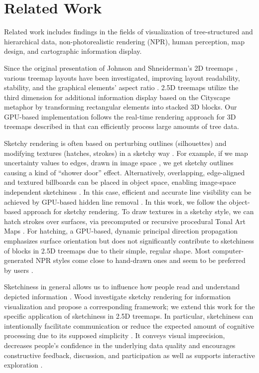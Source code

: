 
\section{Related Work}
\label{sec:related}

\noindent
Related work includes findings in the fields of visualization of tree-structured and hierarchical data, non-photorealistic rendering (NPR), human perception, map design, and cartographic information display. 

Since the original presentation of Johnson and Shneiderman's 2D treemaps \cite{Johnson1991}, 
various treemap layouts have been investigated, 
improving layout readability, stability, and the graphical elements' aspect ratio \cite{Bruls1999,Bederson2002}.
2.5D treemaps utilize the third dimension for additional information display based on the Cityscape metaphor  \cite{Keskin1997} by transforming rectangular elements into stacked 3D blocks.  
Our GPU-based implementation follows the  real-time rendering approach for 3D treemaps described in \cite	{Trapp2013} that can efficiently process large amounts of tree data. 

Sketchy rendering is often based on perturbing outlines (\eg silhouettes) and modifying textures (\eg hatches, strokes) in a sketchy way \cite{Strothotte2002}.
For example, if we map uncertainty values to edges, drawn in  image space \cite{Nienhaus2004}, we get sketchy outlines causing a kind of \enquote{shower door} effect. 
Alternatively, overlapping, edge-aligned and textured billboards can be placed in object space, 
enabling image-space independent sketchiness \cite{Doellner2003}.
In this case, efficient and accurate line visibility can be achieved by GPU-based hidden line removal \cite{Cole2009}.
In this work, we follow the object-based approach for sketchy rendering. 
To draw textures in a sketchy style, we can hatch strokes over surfaces, \eg via precomputed \cite{Praun2001,Webb2002} or recursive procedural Tonal Art Maps \cite{Szecsi2014}. 
For hatching, a GPU-based, dynamic principal direction propagation emphasizes surface orientation \cite{Kim2008} but does not significantly contribute to sketchiness of blocks in 2.5D treemaps due to their simple, regular shape. 
Most computer-generated NPR styles come close to hand-drawn ones and seem to be preferred by users \cite{Cole2008, Isenberg2006}.

Sketchiness in general allows us to influence how people read and understand depicted information \cite{Isenberg2013}.
Wood \etal \cite{Wood2012} investigate sketchy rendering for information visualization and propose a corresponding framework; we extend this work for the specific application of sketchiness in 2.5D treemaps. 
In particular, sketchiness can intentionally facilitate communication \cite{Walny2011} or 
reduce the expected amount of cognitive processing due to its supposed simplicity \cite{Wood2012}.
It conveys visual imprecision, decreases people's confidence in the underlying data quality and encourages constructive feedback, discussion, and participation \cite{Zanola2009,Luboschik2010} as well as supports interactive exploration \cite{Greenberg2011, Browne2011}.

